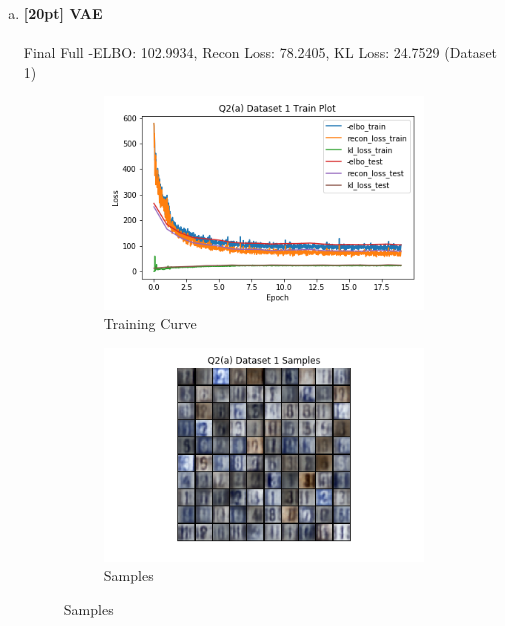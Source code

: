 \documentclass{article}
\begin{document}
\begin{enumerate}[(a)]
  \item {\bf [20pt] VAE} \\\\
  Final Full -ELBO: 102.9934, Recon Loss: 78.2405, KL Loss: 24.7529 (Dataset 1)
  \begin{figure}[H]
         \centering
         \begin{subfigure}[b]{0.475\textwidth}
             \centering
             \includegraphics[width=\textwidth]{figures/q2_a_dset1_train_plot.png}
             \caption{Training Curve}
         \end{subfigure}
         \hfill
         \begin{subfigure}[b]{0.475\textwidth}
             \centering
             \includegraphics[width=\textwidth]{figures/q2_a_dset1_samples.png}
             \caption{Samples}
         \end{subfigure}

\end{figure}
\end{enumerate}
\end{document}

